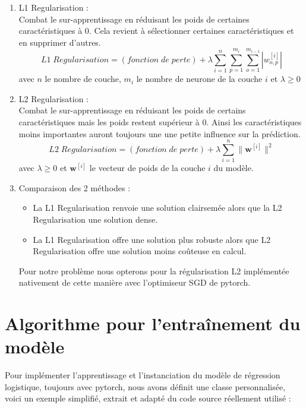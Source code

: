 \documentclass[12pt,english, openany]{book}
\begin{document}
\begin{enumerate}
     
\item L1 Regularisation : \\

Combat le sur-apprentissage en réduisant les poids de certaines caractéristiques à 0. Cela revient à sélectionner certaines caractéristiques et en supprimer d'autres.
$$L1\; Regularisation = (fonction\; de\; perte) + \lambda\sum_{i=1}^{n}\sum_{p=1}^{m_i}\sum_{o=1}^{m_{i-1}} |w^{[i]}_{o,p}|$$
avec $n$ le nombre de couche, $m_i$ le nombre de neurone de la couche $i$ et $\lambda \geq 0$\\

\item L2 Regularisation :\\

Combat le sur-apprentissage en réduisant les poids de certains caractéristiques mais les poids restent supérieur à 0. Ainsi les caractéristiques moins importantes auront toujours une une petite influence sur la prédiction.
$$L2\; Regularisation = (fonction\; de\; perte) + \lambda\sum_{i=1}^{n} \lVert \mathbf{w}^{[i]}\rVert^2$$
avec $\lambda \geq 0$ et $\mathbf{w}^{[i]}$ le vecteur de poids de la couche $i$
du modèle.\\

\item Comparaison des 2 méthodes :\\

\begin{itemize}
    \item La L1 Regularisation renvoie une solution clairsemée alors que la L2 Regularisation une solution dense.
    \item La L1 Regularisation offre une solution plus robuste alors que L2 Regularisation offre une solution moins coûteuse en calcul.\\
\end{itemize}

Pour notre problème nous opterons pour la régularisation L2 implémentée nativement de cette manière avec l'optimiseur SGD de pytorch.

\end{enumerate}

\section{Algorithme pour l'entraînement du modèle}

Pour implémenter l'apprentissage et l'instanciation du modèle de régression logistique, toujours avec pytorch, nous avons définit une classe personnalisée, voici un exemple simplifié, extrait et adapté du code source réellement utilisé :
\end{document}
